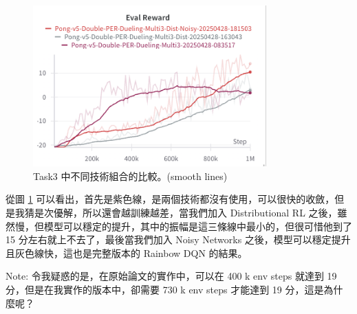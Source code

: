 \begin{figure}[htbp]
    \centering
    \includegraphics[width=0.8\textwidth]{figures/task3_ablation.png}
    \caption{Task3 中不同技術組合的比較。(smooth lines)}
    \label{fig:task3_ablation}
\end{figure}

從圖 \ref{fig:task3_ablation} 可以看出，首先是紫色線，是兩個技術都沒有使用，可以很快的收斂，但是我猜是次優解，所以還會越訓練越差，當我們加入 Distributional RL 之後，雖然慢，但模型可以穩定的提升，其中的振幅是這三條線中最小的，但很可惜他到了 15 分左右就上不去了，最後當我們加入 Noisy Networks 之後，模型可以穩定提升且灰色線快，這也是完整版本的 Rainbow DQN 的結果。

Note: 令我疑惑的是，在原始論文的實作中，可以在 400 k env steps 就達到 19 分，但是在我實作的版本中，卻需要 730 k env steps 才能達到 19 分，這是為什麼呢？


